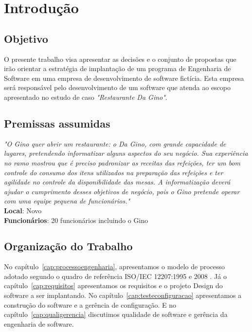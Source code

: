 \chapter{Introdução}
\label{cap:introducao}

\section{Objetivo}

O presente trabalho visa apresentar as decisões e o conjunto de propostas que irão orientar a estratégia de implantação de um programa de Engenharia de Software em uma empresa de desenvolvimento de software fictícia. Esta empresa será responsável pelo desenvolvimento de um software que atenda ao escopo apresentado no estudo de caso \textit{"Restaurante Da Gino"}.

\section{Premissas assumidas}

\emph{"O Gino quer abrir um restaurante: o Da Gino, com grande capacidade de lugares, pretendendo informatizar alguns aspectos do seu negócio. Sua experiência no ramo mostrou que é preciso padronizar as receitas das refeições, ter um bom controle do consumo dos itens utilizados na preparação das refeições e ter agilidade no controle da disponibilidade das mesas. A informatização deverá ajudar o cumprimento desses objetivos de negócio, pois o Gino pretende operar com uma equipe pequena de funcionários."}\\
\textbf{Local}: Novo\\
\textbf{Funcionários}: 20 funcionários incluindo o Gino

\section{Organização do Trabalho}
\label{sec:organizacao_trabalho}

No capítulo~\ref{cap:processoengenharia}, apresentamos o modelo de processo adotado segundo o quadro de referência ISO/IEC 12207:1995 e 2008 \cite{iso12207:95, iso12207:2008}. Já o capítulo~\ref{cap:requisitos} apresentamos os requisitos e o projeto Design do software a ser implantando. No capítulo~\ref{cap:testeconfiguracao} apresentamos a construção do software e a gerência de configuração. E no capítulo~\ref{cap:qualigerencia} discutimos qualidade de software e gerência da engenharia de software.



